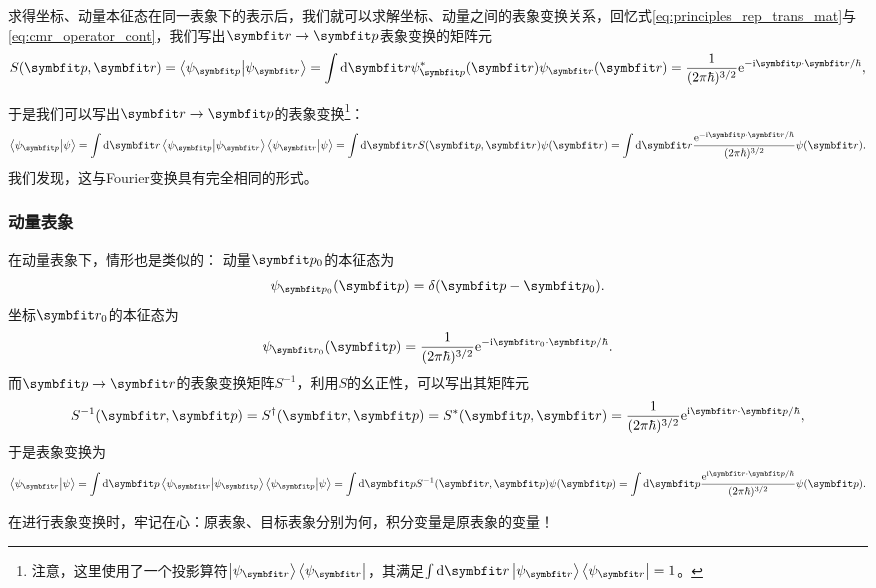 求得坐标、动量本征态在同一表象下的表示后，我们就可以求解坐标、动量之间的表象变换关系，回忆式\eqref{eq:principles_rep_trans_mat}与\eqref{eq:cmr_operator_cont}，我们写出$\rr\rightarrow\pp$表象变换的矩阵元
\begin{equation}
    S(\pp,\rr) = \braket{\psi_{\pp}}{\psi_{\rr}} = \int\dd\rr \psi_{\pp}^*(\rr) \psi_{\rr}(\rr) = \frac{1}{(2\pi\hbar)^{3/2}} \ee^{-\ii\pp\cdot\rr/\hbar},
\end{equation}
\begin{tcolorbox}
于是我们可以写出$\rr\rightarrow\pp$的表象变换\footnote{注意，这里使用了一个投影算符$\ket{\psi_{\rr}}\bra{\psi_{\rr}}$，其满足$\int\dd\rr\ket{\psi_{\rr}}\bra{\psi_{\rr}}=1$。}：
\begin{equation}
    \braket{\psi_{\pp}}{\psi}
    = \int\dd\rr \braket{\psi_{\pp}}{\psi_{\rr}}\braket{\psi_{\rr}}{\psi}
    = \int\dd\rr S(\pp,\rr)\psi(\rr)
    = \int\dd\rr \frac{\ee^{-\ii\pp\cdot\rr/\hbar}}{(2\pi\hbar)^{3/2}} \psi(\rr).
\end{equation}
我们发现，这与Fourier变换具有完全相同的形式。
\end{tcolorbox}

\subsubsection{动量表象}

在动量表象下，情形也是类似的：
动量$\pp_0$的本征态为
\begin{equation}
    \psi_{\pp_0}(\pp) = \delta(\pp-\pp_0).
\end{equation}
坐标$\rr_0$的本征态为
\begin{equation}
    \psi_{\rr_0}(\pp) = \frac{1}{(2\pi\hbar)^{3/2}} \ee^{-\ii\rr_0\cdot\pp/\hbar}.
\end{equation}
而$\pp\rightarrow\rr$的表象变换矩阵$S^{-1}$，利用$S$的幺正性，可以写出其矩阵元
\begin{equation}
    S^{-1}(\rr,\pp) = S^\dag (\rr,\pp) = S^*(\pp,\rr)
    = \frac{1}{(2\pi\hbar)^{3/2}} \ee^{\ii\rr\cdot\pp/\hbar},
\end{equation}
于是表象变换为
\begin{equation}
    \braket{\psi_{\rr}}{\psi}
    = \int\dd\pp \braket{\psi_{\rr}}{\psi_{\pp}}\braket{\psi_{\pp}}{\psi}
    = \int\dd\pp S^{-1}(\rr,\pp)\psi(\pp)
    = \int\dd\pp \frac{\ee^{\ii\rr\cdot\pp/\hbar}}{(2\pi\hbar)^{3/2}} \psi(\pp).
\end{equation}

在进行表象变换时，牢记在心：原表象、目标表象分别为何，积分变量是原表象的变量！


